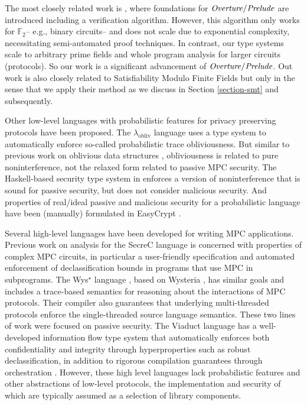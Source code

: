 
The most closely related work is \cite{skalka-near-ppdp24}, where
foundations for $\mathit{Overture}/\mathit{Prelude}$ are introduced including a
verification algorithm. However, this algorithm only works for
$\mathbb{F}_2$-- e.g., binary circuits-- and does not scale due to
exponential complexity, necessitating semi-automated proof
techniques. In contrast, our type systems scale to arbitrary prime
fields and whole program analysis for larger circuits (protocols). So
our work is a significant advancement of $\mathit{Overture}/\mathit{Prelude}$.  Out
work is also closely related to Satisfiability Modulo Finite Fields
\cite{SMFF} but only in the sense that we apply their method as we
discuss in Section \ref{section-smt} and subsequently.

Other low-level languages with probabilistic features for privacy
preserving protocols have been proposed. The
$\lambda_{\mathrm{obliv}}$ language \cite{darais2019language} uses a
type system to automatically enforce so-called probabilistic trace
obliviousness.  But similar to previous work on oblivious data
structures \cite{10.1145/3498713}, obliviousness is related to pure
noninterference, not the relaxed form related to passive MPC
security. The Haskell-based security type system in \cite{6266151}
enforces a version of noninterference that is sound for passive
security, but does not consider malicious security. And properties of
real/ideal passive and malicious security for a probabilistic language
have been (manually) formulated in EasyCrypt \cite{8429300}.

\compwrapfig

Several high-level languages have been developed for writing MPC
applications. Previous work on analysis for the
SecreC language \cite{almeida2018enforcing,10.1145/2637113.2637119} is
concerned with properties of complex MPC circuits, in particular a
user-friendly specification and automated enforcement of
declassification bounds in programs that use MPC in subprograms. The
Wys$^\star$ language \cite{wysstar}, based on Wysteria
\cite{rastogi2014wysteria}, has similar goals and includes a
trace-based semantics for reasoning about the interactions of MPC
protocols. Their compiler also guarantees that underlying
multi-threaded protocols enforce the single-threaded source language
semantics. These two lines of work were focused on passive
security. The Viaduct language \cite{10.1145/3453483.3454074} has a
well-developed information flow type system that automatically
enforces both confidentiality and integrity through hyperproperties
such as robust declassification, in addition to rigorous compilation
guarantees through orchestration \cite{viaduct-UC}. However, these
high level languages lack probabilistic features and other
abstractions of low-level protocols, the implementation and security
of which are typically assumed as a selection of library components.

